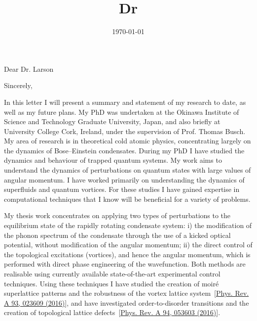 \documentclass[12pt,a4paper,unicode]{moderncv}
\title{Dr}
\begin{document}
    \date{\today} %
    \opening{Dear Dr. Larson}
    \closing{Sincerely,}
    \makelettertitle
{
    \vspace{-0.5cm}

\iffalse
    Cover letter
    CV – degrees and other completed courses, work experience and a list of publications
    Research proposal (no more than 3 pages) describing:
    – why you are interested in the field/project described in the advertisement
    – why and how you wish to complete the project
    – what makes you suitable for the project in question
    Copy of PhD diploma
    Publications in support of your application (no more than 3 files).
\fi

In this letter I will present a summary and statement of my research to date, as well as my future plans. My PhD was undertaken at the Okinawa Institute of Science and Technology Graduate University, Japan, and also briefly at University College Cork, Ireland, under the supervision of Prof. Thomas Busch. My area of research is in theoretical cold atomic physics, concentrating largely on the dynamics of Bose--Einstein condensates. During my PhD I have studied the dynamics and behaviour of trapped quantum systems. My work aims to understand the dynamics of perturbations on quantum states with large values of angular momentum. I have worked primarily on understanding the dynamics of superfluids and quantum vortices. For these studies I have gained expertise in computational techniques that I know will be beneficial for a variety of problems.

My thesis work concentrates on applying two types of perturbations to the equilibrium state of the rapidly rotating condensate system: i) the modification of the phonon spectrum of the condensate through the use of a kicked optical potential, without modification of the angular momentum; ii) the direct control of the topological excitations (vortices), and hence the angular momentum, which is performed with direct phase engineering of the wavefunction. Both methods are realisable using currently available state-of-the-art experimental control techniques. Using these techniques I have studied the creation of moir\'e superlattice patterns and the robustness of the vortex lattice system~[\href{http://journals.aps.org/pra/abstract/10.1103/PhysRevA.93.023609}{Phys. Rev. A 93, 023609 (2016)}], and have investigated order-to-disorder transitions and the creation of topological lattice defects~[\href{https://journals.aps.org/pra/abstract/10.1103/PhysRevA.94.053603}{Phys. Rev. A 94, 053603 (2016)}].

}
\end{document}
